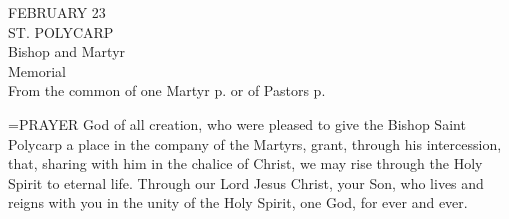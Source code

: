 \begin{center}\normalsize FEBRUARY 23\\
\footnotesize ST. POLYCARP\\
\footnotesize Bishop and Martyr\\
\footnotesize Memorial\\
\footnotesize From the common of one Martyr p.    or of Pastors p. \\
\end{center}

\hangindent=\parindent \small{PRAYER 
God of all creation,
who were pleased to give the Bishop Saint Polycarp
a place in the company of the Martyrs,
grant, through his intercession,
that, sharing with him in the chalice of Christ,
we may rise through the Holy Spirit to eternal life.
Through our Lord Jesus Christ, your Son,
who lives and reigns with you in the unity of the Holy Spirit,
one God, for ever and ever.\\}
 
